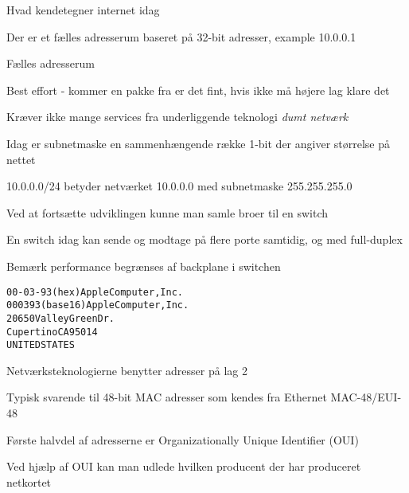 \documentclass[Screen16to9,17pt]{foils}
\begin{document}
\begin{list1}
\item Hvad kendetegner internet idag
\item Der er et fælles adresserum baseret på 32-bit adresser, example 10.0.0.1
\end{list1}



\begin{list1}
\item Fælles adresserum
\item Best effort - kommer en pakke fra er det fint, hvis ikke må højere lag klare det
\item Kræver ikke mange services fra underliggende teknologi \emph{dumt netværk}
\item Idag er subnetmaske en sammenhængende række 1-bit der angiver størrelse på nettet
\item 10.0.0.0/24 betyder netværket 10.0.0.0 med subnetmaske 255.255.255.0
\end{list1}






\begin{list1}
\item Ved at fortsætte udviklingen kunne man samle broer til en switch
\item En switch idag kan sende og modtage på flere porte samtidig, og med full-duplex
\item Bemærk performance begrænses af backplane i switchen
\end{list1}



\begin{alltt}
00-03-93   (hex)        Apple Computer, Inc.
000393     (base 16)    Apple Computer, Inc.
                        20650 Valley Green Dr.
                        Cupertino CA 95014
                        UNITED STATES
\end{alltt}
\begin{list1}
\item Netværksteknologierne benytter adresser på lag 2
\item Typisk svarende til 48-bit MAC adresser som kendes fra Ethernet MAC-48/EUI-48
\item Første halvdel af adresserne er Organizationally Unique Identifier (OUI)
\item Ved hjælp af OUI kan man udlede hvilken producent der har produceret netkortet
\item {}
\end{list1}
\end{document}

